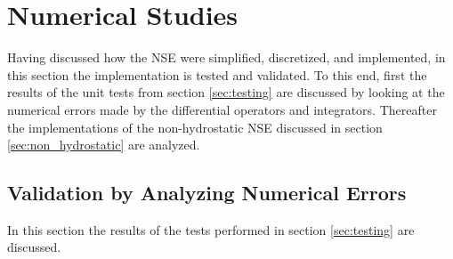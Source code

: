 \chapter{Numerical Studies}\label{chapter:numerical_study}
Having discussed how the NSE were simplified, discretized, and implemented, in this section the implementation is tested and validated.
To this end, first the results of the unit tests from section \ref{sec:testing} are discussed by looking at the numerical errors made by the differential operators and integrators.
Thereafter the implementations of the non-hydrostatic NSE discussed in section \ref{sec:non_hydrostatic} are analyzed.

\section{Validation by Analyzing Numerical Errors}
In this section the results of the tests performed in section \ref{sec:testing} are discussed.

